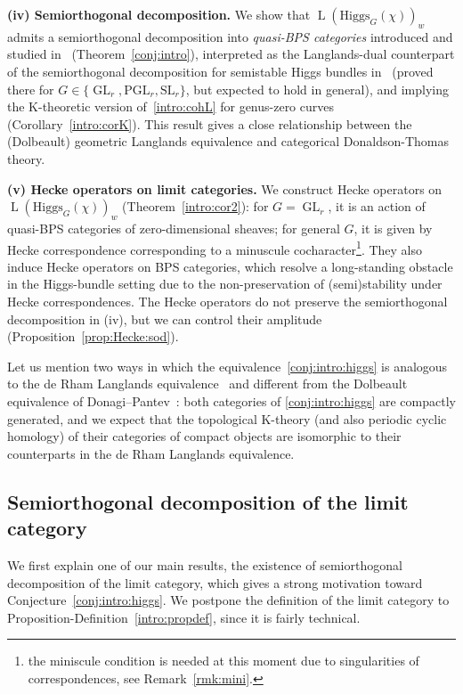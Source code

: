 \documentclass [11pt,oneside,a4paper,mathscr]{amsart}
\theoremstyle{definition}
\newcommand{\LL}{\operatorname{L}}
\newcommand{\GL}{\operatorname{GL}}
\newcommand{\Hig}{\mathrm{Higgs}}
\begin{document}
    \vspace{2mm}

{\bf (iv) Semiorthogonal decomposition.} We show that $\LL(\Hig_G(\chi))_w$ admits a semiorthogonal decomposition
    into \textit{quasi-BPS categories} introduced and studied in~\cite{PThiggs} (Theorem~\ref{conj:intro}), interpreted as the Langlands-dual counterpart of the semiorthogonal decomposition for semistable Higgs bundles in~\cite{PThiggs} (proved there for $G \in \{\GL_r, \mathrm{PGL}_r, \mathrm{SL}_r\}$, but expected to hold in general), and implying the K-theoretic version of~\eqref{intro:cohL} for genus-zero curves (Corollary~\ref{intro:corK}). This result gives a 
    close relationship between the (Dolbeault) geometric Langlands equivalence and categorical 
    Donaldson-Thomas theory. 

\vspace{2mm}
    
    {\bf (v) Hecke operators on limit categories.} We construct Hecke operators on $\LL(\Hig_G(\chi))_w$ (Theorem~\ref{intro:cor2}):
    for $G=\GL_r$, it is an action of quasi-BPS categories of zero-dimensional sheaves;
    for general $G$, it is given by Hecke correspondence corresponding to a minuscule cocharacter\footnote{the miniscule condition is needed at this moment due to singularities of correspondences, see Remark~\ref{rmk:mini}.}. They also induce Hecke operators on BPS categories, which resolve 
    a long-standing obstacle in the Higgs-bundle setting due to the non-preservation of (semi)stability under Hecke correspondences. The Hecke operators do not preserve the semiorthogonal decomposition in (iv), but we can control 
    their amplitude (Proposition~\ref{prop:Hecke:sod}). 
    
\vspace{2mm}


Let us mention two ways in which the equivalence~\eqref{conj:intro:higgs} is analogous to the de Rham Langlands equivalence~\cite{BD0, AG} and different from the Dolbeault equivalence of Donagi--Pantev~\cite{DoPa}: both categories of \eqref{conj:intro:higgs} are compactly generated, and we expect that the topological K-theory (and also periodic cyclic homology) of their categories of compact objects are isomorphic to their counterparts in the de Rham Langlands equivalence.


\subsection{Semiorthogonal decomposition of the limit category}
We first explain one of our main results, the existence of semiorthogonal decomposition of
the limit category, which gives a strong motivation toward Conjecture~\ref{conj:intro:higgs}. We postpone the definition of the limit category to Proposition-Definition~\ref{intro:propdef}, since it is fairly technical. 
\end{document}
